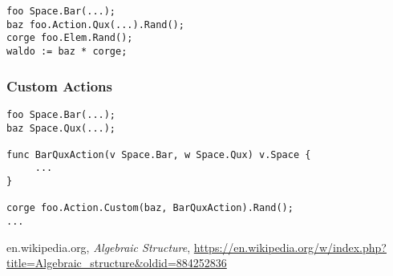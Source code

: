 \documentclass{amsbook}
\begin{document}
\begin{verbatim}
foo Space.Bar(...);
baz foo.Action.Qux(...).Rand();
corge foo.Elem.Rand();
waldo := baz * corge;
\end{verbatim}


\subsubsection{Custom Actions}

\begin{verbatim}
foo Space.Bar(...);
baz Space.Qux(...);

func BarQuxAction(v Space.Bar, w Space.Qux) v.Space {
     ...
}

corge foo.Action.Custom(baz, BarQuxAction).Rand();
...
\end{verbatim}

\begin{thebibliography}{9}

en.wikipedia.org,
\textit{Algebraic Structure},
\url{https://en.wikipedia.org/w/index.php?title=Algebraic_structure&oldid=884252836}
  
\end{thebibliography}
\end{document}
